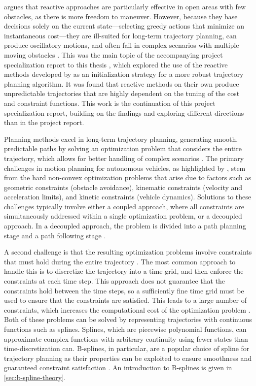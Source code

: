 \citet{Wang2019} argues that reactive approaches are particularly effective in open areas with few obstacles, as there is more freedom to maneuver.
However, because they base decisions solely on the current state---selecting greedy actions that minimize an instantaneous cost---they are ill-suited for long-term trajectory planning, can produce oscillatory motions, and often fail in complex scenarios with multiple moving obstacles \citep{Liu2024-VO-Traj}. This was the main topic of the accompanying project specialization report to this thesis \citep{prosjektoppgave}, which explored the use of the reactive methods developed by \citet{Thyri2022-VO} as an initialization strategy for a more robust trajectory planning algorithm. It was found that reactive methods on their own produce unpredictable trajectories that are highly dependent on the tuning of the cost and constraint functions. This work is the continuation of this project specialization report, building on the findings and exploring different directions than in the project report.

Planning methods excel in long-term trajectory planning, generating smooth, predictable paths by solving an optimization problem that considers the entire trajectory, which allows for better handling of complex scenarios \citep{Liu2024-VO-Traj}.
The primary challenges in motion planning for autonomous vehicles, as highlighted by \citet{mercy2016spline}, stem from the hard non-convex optimization problems that arise due to factors such as geometric constraints (obstacle avoidance), kinematic constraints (velocity and acceleration limits), and kinetic constraints (vehicle dynamics). Solutions to these challenges typically involve either a coupled approach, where all constraints are simultaneously addressed within a single optimization problem, or a decoupled approach. In a decoupled approach, the problem is divided into a path planning stage and a path following stage \citep{mercy2016spline}.

A second challenge is that the resulting optimization problems involve constraints that must hold during the entire trajectory \citep{mercy2016spline}. The most common approach to handle this is to discretize the trajectory into a time grid, and then enforce the constraints at each time step. This approach does not guarantee that the constraints hold between the time steps, so a sufficiently fine time grid must be used to ensure that the constraints are satisfied. This leads to a large number of constraints, which increases the computational cost of the optimization problem \citep{mercy2016spline}.
Both of these problems can be solved by representing trajectories with continuous functions such as splines. Splines, which are piecewise polynomial functions, can approximate complex functions with arbitrary continuity using fewer states than time-discretization can. B-splines, in particular, are a popular choice of spline for trajectory planning as their properties can be exploited to ensure smoothness and guaranteed constraint satisfaction \citep{van2015b}. An introduction to B-splines is given in \cref{sec:b-spline-theory}.



